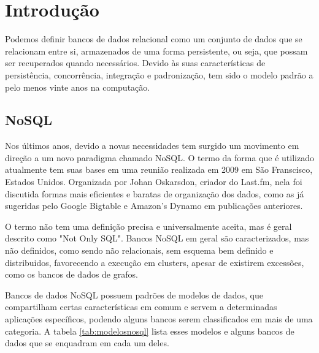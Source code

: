 \chapter{Introdução}

Podemos definir bancos de dados relacional como um conjunto de dados que se relacionam entre si, armazenados de uma forma persistente, ou seja, que possam ser recuperados quando necessários. Devido às suas características de persistência, concorrência, integração e padronização, tem sido o modelo padrão a pelo menos vinte anos na computação\cite{pramod}.

\section{NoSQL}
Nos últimos anos, devido a novas necessidades tem surgido um movimento em direção a um novo paradigma chamado NoSQL. O termo da forma que é utilizado atualmente tem suas bases em uma reunião realizada em 2009 em São Franscisco, Estados Unidos. Organizada por Johan Oskarsdon, criador do Last.fm, nela foi discutida formas mais eficientes e baratas de organização dos dados, como as já sugeridas pelo Google Bigtable e Amazon's Dynamo em publicações anteriores.

O termo não tem uma definição precisa e universalmente aceita, mas é geral descrito como "Not Only SQL". Bancos NoSQL em geral são caracterizados, mas não definidos, como sendo não relacionais, sem esquema bem definido e distribuidos, favorecendo a execução em clusters, apesar de existirem excessões, como os bancos de dados de grafos.

Bancos de dados NoSQL possuem padrões de modelos de dados, que compartilham certas características em comum e servem a determinadas aplicações específicos, podendo alguns bancos serem classificados em mais de uma categoria. A tabela \ref{tab:modelosnosql} lista esses modelos e alguns bancos de dados que se enquadram em cada um deles.

